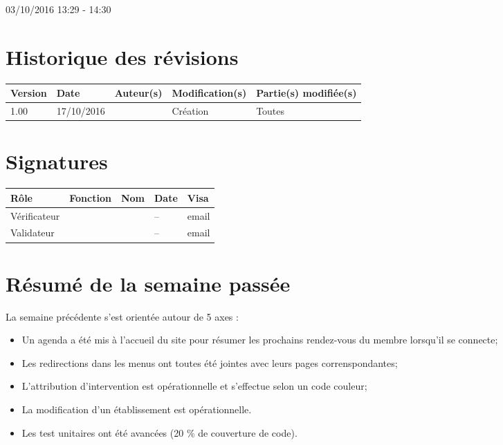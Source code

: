 \documentclass [a4paper] {article}
\begin{document}
03/10/2016			 				%
\hfill   
\hfill 	 13:29 - 14:30				%


\section*{Historique des révisions}
\begin{center}
			\begin{tabular}{| p{2.5cm} | p{3cm} | p{3cm} | p{3cm} | p{3.5cm} |}
				\hline
				\rowcolor{Gray}
				Version & Date & Auteur(s) & Modification(s) & Partie(s) modifiée(s)		 \\
				\hline
				1.00 & 17/10/2016 & \Kafui & Création & Toutes \\
				\hline			
			\end{tabular}
		\end{center}

\section*{Signatures}

		\begin{center}
			\begin{tabular}{| p{2.5cm} | p{4cm} | p{3cm} | p{3cm} | p{2.5cm} |}
				\hline
				\rowcolor{Gray}
				Rôle & Fonction & Nom & Date & Visa		 \\
				\hline
				Vérificateur & \RGC & \Melissa & -- & email \\[30pt]
				\hline
				Validateur & \CP & \Pierre &  -- & email \\[30pt]	
				\hline
			\end{tabular}
		\end{center}

\section{Résumé de la semaine passée}
La semaine précédente s'est orientée autour de 5 axes :  
\begin{itemize}
	\item Un agenda a été mis à l'accueil du site pour résumer les prochains rendez-vous du membre lorsqu'il se connecte;
	\item Les redirections dans les menus ont toutes été jointes avec leurs pages correnspondantes;
	\item L'attribution d'intervention est opérationnelle et s'effectue selon un code couleur;
	\item La modification d'un établissement est opérationnelle.
	\item Les test unitaires ont été avancées (20 \% de couverture de code).
\end{itemize} 
\end{document}

